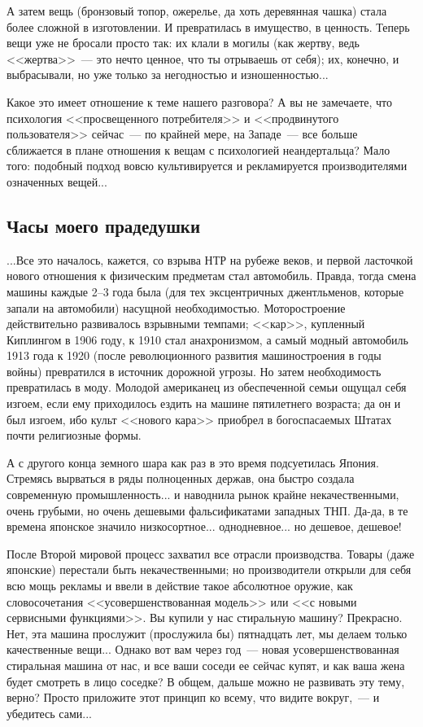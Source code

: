 \documentclass{scrbook}
\newcommand{\flqq}{<<}
\newcommand{\frqq}{>>}
\newcommand{\mdash}{~--- }
\newcommand{\ndash}{--}
\newcommand{\commamdash}{~--- } %
\newcommand{\essaysection}[1]{\subsection*{#1}\nopagebreak}
\begin{document}
А затем вещь (бронзовый топор, ожерелье, да хоть деревянная чашка) стала более сложной в изготовлении. И превратилась в имущество, в ценность. Теперь вещи уже не бросали просто так: их клали в могилы (как жертву, ведь {\flqq}жертва{\frqq}{\mdash}это нечто ценное, что ты отрываешь от себя); их, конечно, и выбрасывали, но уже только за негодностью и изношенностью...

Какое это имеет отношение к теме нашего разговора? А вы не замечаете, что психология {\flqq}просвещенного потребителя{\frqq} и {\flqq}продвинутого пользователя{\frqq} сейчас{\mdash}по крайней мере, на Западе{\mdash}все больше сближается в плане отношения к вещам с психологией неандертальца? Мало того: подобный подход вовсю культивируется и рекламируется производителями означенных вещей...

\essaysection{Часы моего прадедушки}

...Все это началось, кажется, со взрыва НТР на рубеже веков, и первой ласточкой нового отношения к физическим предметам стал автомобиль. Правда, тогда смена машины каждые 2{\ndash}3 года была (для тех эксцентричных джентльменов, которые запали на автомобили) насущной необходимостью. Моторостроение действительно развивалось взрывными темпами; {\flqq}кар{\frqq}, купленный Киплингом в 1906 году, к 1910 стал анахронизмом, а самый модный автомобиль 1913 года к 1920 (после революционного развития машиностроения в годы войны) превратился в источник дорожной угрозы. Но затем необходимость превратилась в моду. Молодой американец из обеспеченной семьи ощущал себя изгоем, если ему приходилось ездить на машине пятилетнего возраста; да он и был изгоем, ибо культ {\flqq}нового кара{\frqq} приобрел в богоспасаемых Штатах почти религиозные формы.

А с другого конца земного шара как раз в это время подсуетилась Япония. Стремясь вырваться в ряды полноценных держав, она быстро создала современную промышленность... и наводнила рынок крайне некачественными, очень грубыми, но очень дешевыми фальсификатами западных ТНП. Да-да, в те времена японское значило низкосортное... однодневное... но дешевое, дешевое!

После Второй мировой процесс захватил все отрасли производства. Товары (даже японские) перестали быть некачественными; но производители открыли для себя всю мощь рекламы и ввели в действие такое абсолютное оружие, как словосочетания {\flqq}усовершенствованная модель{\frqq} или {\flqq}с новыми сервисными функциями{\frqq}. Вы купили у нас стиральную машину? Прекрасно. Нет, эта машина прослужит (прослужила бы) пятнадцать лет, мы делаем только качественные вещи... Однако вот вам через год{\mdash}новая усовершенствованная стиральная машина от нас, и все ваши соседи ее сейчас купят, и как ваша жена будет смотреть в лицо соседке? В общем, дальше можно не развивать эту тему, верно? Просто приложите этот принцип ко всему, что видите вокруг,{\commamdash}и убедитесь сами...
\end{document}
